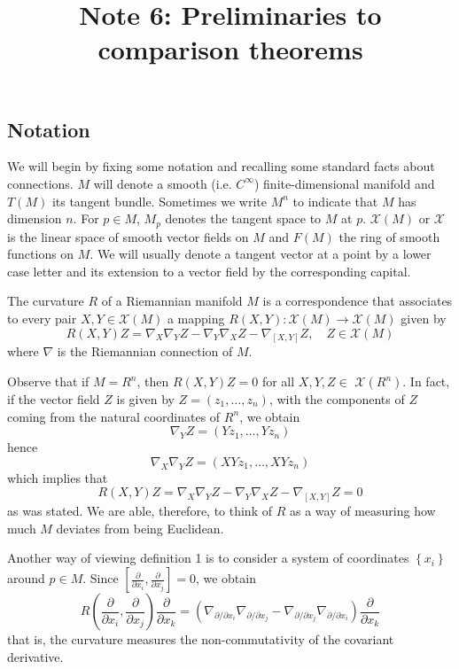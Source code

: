 \documentclass{ctexart}
\title{Note 6: Preliminaries to comparison theorems}
\date{} %
\begin{document}
\maketitle

\subsection*{Notation}
We will begin by fixing some notation and recalling some standard facts about connections. $M$ will denote a smooth (i.e. $C^\infty$) finite-dimensional
manifold and $T(M)$ its tangent bundle. Sometimes we write $M^n$ to indicate that $M$ has dimension $n$. For $p \in M$, 
$M_p$ denotes the tangent space to $M$ at $p$. $\mathcal{X}(M)$ or $\mathcal{X}$ is the linear space of smooth vector fields on $M$ and $F(M)$ the ring of 
smooth functions on $M$. We will usually denote a tangent vector at a point by a lower case letter and its extension to a vector field by the corresponding capital.

\begin{definition}
    The curvature $R$ of a Riemannian manifold $M$ is a correspondence that associates to every pair $X, Y \in \mathcal{X}(M)$ a mapping $R(X, Y): \mathcal{X}(M) \rightarrow \mathcal{X}(M)$ given by
    $$
    R(X, Y) Z=\nabla_X \nabla_Y Z-\nabla_Y \nabla_X Z-\nabla_{[X, Y]} Z, \quad Z \in \mathcal{X}(M)
    $$
    where $\nabla$ is the Riemannian connection of $M$.
\end{definition}
Observe that if $M=R^n$, then $R(X, Y) Z=0$ for all $X, Y, Z \in$ $\mathcal{X}\left(R^n\right)$. In fact, if the vector field $Z$ is given by $Z=\left(z_1, \ldots, z_n\right)$, with the components of $Z$ coming from the natural coordinates of $R^n$, we obtain
$$
\nabla_Y Z=\left(Y z_1, \ldots, Y z_n\right)
$$
hence
$$
\nabla_X \nabla_Y Z=\left(X Y z_1, \ldots, X Y z_n\right)
$$
which implies that
$$
R(X, Y) Z=\nabla_X \nabla_Y Z-\nabla_Y \nabla_X Z-\nabla_{[X, Y]} Z=0
$$
as was stated. We are able, therefore, to think of $R$ as a way of measuring how much $M$ deviates from being Euclidean.

Another way of viewing definition 1 is to consider a system of coordinates $\left\{x_i\right\}$ around $p \in M$. Since $\left[\frac{\partial}{\partial x_i}, \frac{\partial}{\partial x_j}\right]=0$, we obtain
$$
R\left(\frac{\partial}{\partial x_i}, \frac{\partial}{\partial x_j}\right) \frac{\partial}{\partial x_k}
=\left(\nabla_{\partial / \partial x_i} \nabla_{\partial / \partial x_j}-\nabla_{\partial / \partial x_j} \nabla_{\partial / \partial x_i}\right) \frac{\partial}{\partial x_k}
$$
that is, the curvature measures the non-commutativity of the covariant derivative. 
\end{document}
